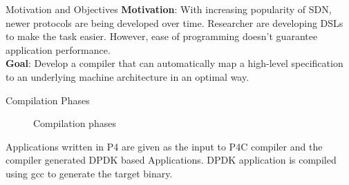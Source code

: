 \documentclass[final]{beamer}
\newlength{\onecolwid}
\begin{document}
\begin{frame}
\begin{columns}[t]
\begin{column}{\onecolwid}
\begin{exampleblock}{Motivation and Objectives}
\textbf{Motivation}: With increasing popularity of SDN, newer protocols are being developed over time. Researcher are developing DSLs to make the task easier. However, ease of programming doesn't guarantee application performance.\\
\textbf{Goal}: Develop a compiler that can automatically map a high-level specification to an underlying machine architecture in an optimal way.
\end{exampleblock}


\begin{exampleblock}{Compilation Phases}


\begin{figure}
\caption{Compilation phases}
\end{figure}
Applications written in P4\cite{p4} are given as the input to P4C compiler and the compiler generated DPDK\cite{DPDK} based Applications. DPDK application is compiled using gcc to generate the target binary.
\end{exampleblock}



\end{column}
\end{columns}
\end{frame}
\end{document}
